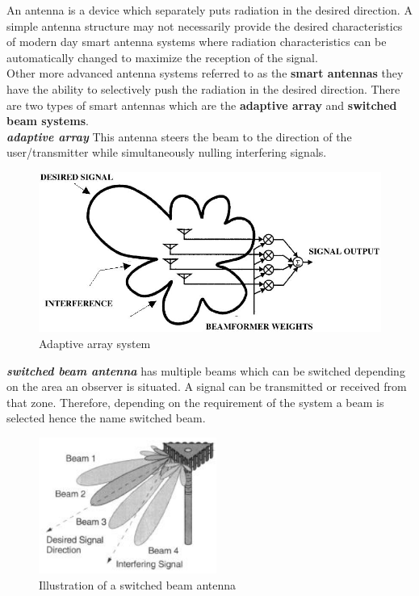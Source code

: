 An antenna is a device which separately puts radiation in the desired direction. A simple antenna structure may not necessarily provide the desired characteristics of modern day smart antenna systems where radiation characteristics can be automatically changed to maximize the reception of the signal.\\

Other more advanced antenna systems referred to as the \textbf{smart antennas} they have the ability to selectively push the radiation in the desired direction. There are two types of smart antennas which are the \textbf{adaptive array} and \textbf{switched beam systems}.\\

\textit{\textbf{adaptive array}}
This antenna steers the beam to the direction of the user/transmitter while simultaneously nulling interfering signals.
\begin{figure}[h]
\centering
\includegraphics[scale=0.3]{./graphics/fh06_02}
\caption{Adaptive array system}
\end{figure}

\textit{\textbf{switched beam antenna}} has multiple beams which can be switched depending on the area an observer is situated. A signal can be transmitted or received from that zone. Therefore, depending on the requirement of the system a beam is selected hence the name switched beam.
\begin{figure}[h]
\centering
\includegraphics[scale=0.7]{./graphics/switchedbeam}
\caption{Illustration of a switched beam antenna}
\end{figure} 

